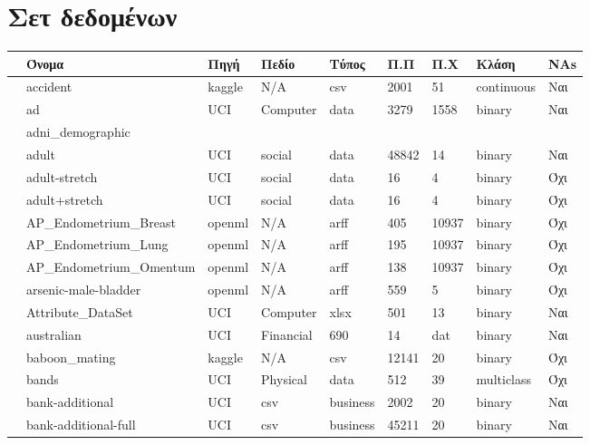 
	\chapter{Σετ δεδομένων }
\label{appendix:Datasets}
{ \footnotesize
	 	\begin{longtable}{|l| l| l | l | l | l |l | l | l | } 
 			\hline
 			 & Όνομα & Πηγή & Πεδίο & Τύπος & { Π.Π} & {Π.Χ} & Κλάση & NAs \\
 			\hline
 							\rownumber  & accident \citep{accident} & kaggle & N/A  & csv & 2001  & 51 &  continuous & Ναι \\
 							\rownumber & ad \citep{ad} & UCI & Computer  & data & 3279 &  1558 & binary & Ναι\\
 							\rownumber & adni\_demographic & & & & & & &\\
 							\rownumber &  adult  \citep{census}  & UCI & social & data  & 48842 & 14 & binary & Ναι\\
 							\rownumber &  adult-stretch  \citep{balloons} & UCI & social & data & 16 & 4 & binary & Όχι\\
 							\rownumber &  adult+stretch  \citep{balloons} & UCI & social & data & 16 & 4 & binary & Όχι\\
 							\rownumber &  AP\_Endometrium\_Breast \citep{breast} & openml & N/A & arff & 405 & 10937 & binary & Όχι\\
 							\rownumber & AP\_Endometrium\_Lung \citep{lung} & openml & N/A & arff  & 195 & 10937 & binary  & Όχι\\
 							\rownumber &  AP\_Endometrium\_Omentum \citep{omentum} & openml & N/A & arff & 138 & 10937 & binary & Όχι \\
 							\rownumber & arsenic-male-bladder \citep{bladder} & openml & N/A & arff & 559 & 5 & binary & Όχι\\
 							\rownumber & Attribute\_DataSet & UCI & Computer & xlsx & 501 & 13 & binary  & Ναι \\
 							\rownumber & australian \citep{australian} & UCI  & Financial & 690 & 14 &  dat & binary & Ναι \\
 							\rownumber & baboon\_mating \citep{baboon} & kaggle & N/A & csv & 12141& 20& binary & Όχι\\
 							\rownumber &  bands \citep{bands} & UCI & Physical & data & 512 & 39& multiclass & Όχι\\
 							\rownumber & bank-additional & UCI & csv & business & 2002 & 20 & binary & Ναι \\
 							\rownumber &  bank-additional-full & UCI & csv& business & 45211& 20& binary& Ναι \\

\end{longtable}}
